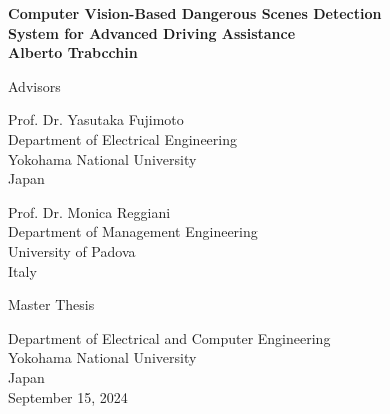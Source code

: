 \begin{titlepage}
\begin{center}

\vspace*{1cm}
\textbf{\Large{Computer Vision-Based Dangerous Scenes Detection}\\ 
        \vspace*{0.2cm}
        \Large{System for Advanced Driving Assistance}}\\
\vspace*{2cm}
\textbf{\large{Alberto Trabcchin}}\\
\vfill

\vspace*{4cm}
Advisors \\
\vspace*{1cm}
\begin{minipage}[t]{0.48\textwidth}
    Prof. Dr. Yasutaka Fujimoto \\
    Department of Electrical Engineering\\
    Yokohama National University \\
    Japan

\end{minipage}
\hfill
\begin{minipage}[t]{0.48\textwidth}
\begin{flushright}
    Prof. Dr. Monica Reggiani \\
    Department of Management Engineering \\
    University of Padova \\
    Italy
\end{flushright}
\end{minipage}

\vfill

Master Thesis\\
    
\vspace{0.8cm}

    
Department of Electrical and Computer Engineering\\
Yokohama National University\\
Japan\\
September 15, 2024
            
\end{center}
\end{titlepage}

\afterpage{\blankpage}